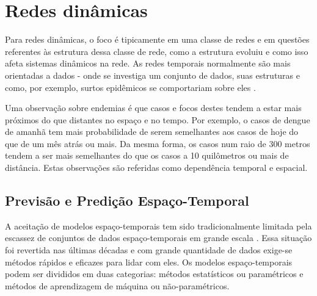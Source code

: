 \chapter{Redes dinâmicas}
 \label{chap:redes-dinamicas}
 
Para redes dinâmicas, o foco é tipicamente em uma classe de redes e em questões referentes às estrutura dessa classe de rede, como a estrutura evoluiu e como isso afeta sistemas dinâmicos na rede. As redes temporais normalmente são mais orientadas a dados - onde se investiga um conjunto de dados, suas estruturas e como, por exemplo, surtos epidêmicos se comportariam sobre eles \cite{holme:colloquium}.

Uma observação sobre endemias é que casos e focos destes tendem a estar mais próximos do que distantes no espaço e no tempo. Por exemplo, o casos de dengue de amanhã tem mais probabilidade de serem semelhantes aos casos de hoje do que de um mês atrás ou mais. Da mesma forma, os casos num raio de 300 metros tendem a ser mais semelhantes do que os casos a 10 quilômetros ou mais de distância. Estas observações são referidas como dependência temporal e espacial.

\section{Previsão e Predição Espaço-Temporal}

A aceitação de modelos espaço-temporais tem sido tradicionalmente limitada pela escassez de conjuntos de dados espaço-temporais em grande escala \cite{Griffith2010}. Essa situação foi revertida nas últimas décadas e com grande quantidade de dados exige-se métodos rápidos e eficazes para lidar com eles. Os modelos espaço-temporais podem ser divididos em duas categorias: métodos estatísticos ou paramétricos e métodos de aprendizagem de máquina ou não-paramétricos.

